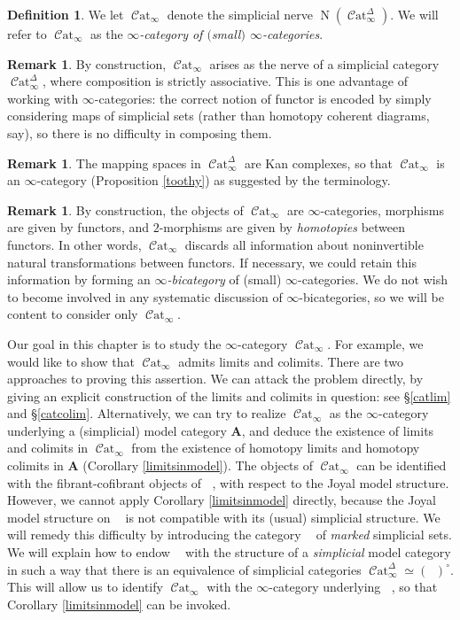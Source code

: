 \documentclass{report}[10pt, final]
\DeclareMathOperator{\Nerve}{N}
\newcommand{\bfA}{{\mathbf A}}
\newcommand{\degree}{\circ}
\DeclareMathOperator{\sSet}{\mathcal{S}et_{\Delta}}
\DeclareMathOperator{\mSet}{\mathcal{S}et_{\Delta}^{+}}
\DeclareMathOperator{\Cat}{\mathcal{C}at}
\theoremstyle{definition}
\newtheorem{definition}[theorem]{Definition}
\newtheorem{remark}[theorem]{Remark}
\begin{document}
\begin{chapter2onwards}
\begin{definition}
We let $\Cat_{\infty}$ denote the simplicial nerve
$\Nerve(\Cat_{\infty}^{\Delta})$. We will refer to $\Cat_{\infty}$ as the {\it $\infty$-category
of $($small$)$ $\infty$-categories}.
\end{definition}

\begin{remark}
By construction, $\Cat_{\infty}$ arises as the nerve of a simplicial category
$\Cat_{\infty}^{\Delta}$, where composition is strictly associative. This is one advantage
of working with $\infty$-categories: the correct notion of functor is encoded by simply considering maps of simplicial sets (rather than homotopy coherent diagrams, say), so there is no difficulty in composing them.
\end{remark}

\begin{remark}
The mapping spaces in $\Cat^{\Delta}_{\infty}$ are Kan complexes, so that
$\Cat_{\infty}$ is an $\infty$-category (Proposition \ref{toothy}) as suggested by the terminology.
\end{remark}

\begin{remark}
By construction, the objects of $\Cat_{\infty}$ are $\infty$-categories, morphisms are given by functors, and $2$-morphisms are given by {\em homotopies} between functors. In other words, $\Cat_{\infty}$ discards all information about noninvertible natural transformations between functors. If necessary, we could retain this information by forming an {\it $\infty$-bicategory} of (small) $\infty$-categories. We do not wish to become involved in any systematic discussion of $\infty$-bicategories, so we will be content to consider only $\Cat_{\infty}$.
\end{remark}

Our goal in this chapter is to study the $\infty$-category $\Cat_{\infty}$. For example, we would like to show that $\Cat_{\infty}$ admits limits and colimits. There are two approaches to proving this assertion. We can attack the problem directly, by giving an explicit construction of the limits and colimits in question: see \S \ref{catlim} and \S \ref{catcolim}. Alternatively, we can try to
realize $\Cat_{\infty}$ as the $\infty$-category underlying a (simplicial) model category $\bfA$, and deduce the existence of limits and colimits in $\Cat_{\infty}$ from the existence of homotopy limits and homotopy colimits in $\bfA$ (Corollary \ref{limitsinmodel}). The objects of $\Cat_{\infty}$ can be identified with the fibrant-cofibrant objects of $\sSet$, with respect to the Joyal model structure. However, we cannot apply Corollary \ref{limitsinmodel} directly, because the Joyal model structure on $\sSet$ is not compatible with its (usual) simplicial structure. We will remedy this difficulty by introducing the category $\mSet$ of {\em marked} simplicial sets. We will explain how to endow $\mSet$ with the structure of a {\em simplicial} model category in such a way that there is an equivalence of simplicial categories $\Cat^{\Delta}_{\infty} \simeq (\mSet)^{\degree}$. This will allow us to identify $\Cat_{\infty}$ with the $\infty$-category underlying $\mSet$, so that Corollary \ref{limitsinmodel} can be invoked.


\end{chapter2onwards}
\end{document}

